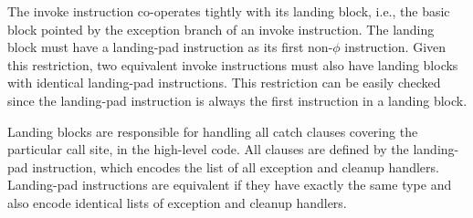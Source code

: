 The invoke instruction co-operates tightly with its landing block, i.e., the
basic block pointed by the exception branch of an invoke instruction.
The landing block must have a landing-pad instruction as its first non-$\phi$
instruction.
Given this restriction, two equivalent invoke instructions must also have
landing blocks with identical landing-pad instructions.
This restriction can be easily checked since the landing-pad instruction is
always the first instruction in a landing block. 

Landing blocks are responsible for handling all catch clauses covering the
particular call site, in the high-level code.
All clauses are defined by the landing-pad instruction, which encodes the list of
all exception and cleanup handlers.
Landing-pad instructions are equivalent if they have exactly the same type and
also encode identical lists of exception and cleanup handlers.





